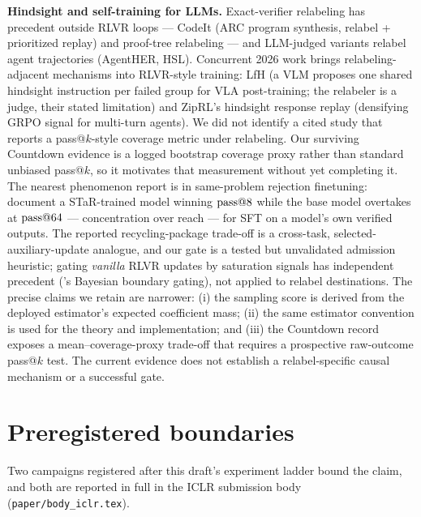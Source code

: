\textbf{Hindsight and self-training for LLMs.} Exact-verifier
relabeling has precedent outside RLVR loops --- CodeIt \citep{codeit}
(ARC program synthesis, relabel + prioritized replay) and proof-tree
relabeling \citep{minimo} --- and LLM-judged variants relabel agent
trajectories (AgentHER, HSL). Concurrent 2026 work brings
relabeling-adjacent mechanisms into RLVR-style training: LfH \citep{lfh}
(a VLM proposes one shared hindsight instruction per failed group for
VLA post-training; the relabeler is a judge, their stated limitation)
and ZipRL's hindsight response replay \citep{ziprl} (densifying GRPO
signal for multi-turn agents). We did not identify a cited study that
reports a pass@$k$-style coverage metric under relabeling. Our surviving
Countdown evidence is a logged bootstrap coverage proxy rather than
standard unbiased pass@$k$, so it motivates that measurement without
yet completing it. The nearest phenomenon report is in same-problem rejection
finetuning: \citet{starcross} document a STaR-trained model winning
$\text{pass@}8$ while the base model overtakes at $\text{pass@}64$ ---
concentration over reach --- for SFT on a model's own verified outputs.
The reported recycling-package trade-off is a cross-task,
selected-auxiliary-update analogue, and our gate is a tested but
unvalidated admission heuristic; gating
\emph{vanilla} RLVR updates by saturation signals has independent
precedent (\citealp{yuan}'s Bayesian boundary gating), not applied to
relabel destinations.
The precise claims we retain are narrower: (i) the sampling score is
derived from the deployed estimator's expected coefficient mass; (ii)
the same estimator convention is used for the theory and implementation;
and (iii) the Countdown record exposes a mean--coverage-proxy trade-off
that requires a prospective raw-outcome pass@$k$ test. The current
evidence does not establish a relabel-specific causal mechanism or a
successful gate.

\section{Preregistered boundaries}\label{sec:boundaries}

Two campaigns registered after this draft's experiment ladder bound the
claim, and both are reported in full in the ICLR submission body
(\texttt{paper/body\_iclr.tex}).

